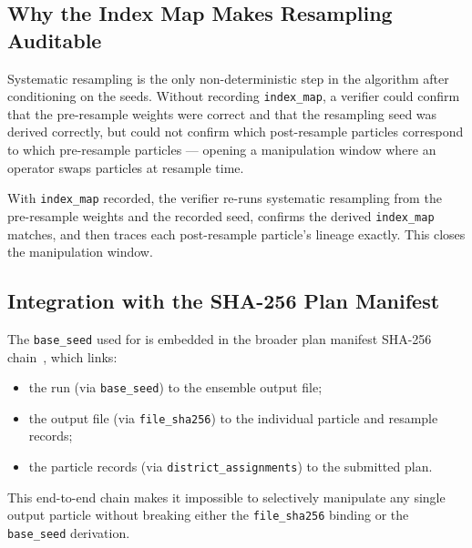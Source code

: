 \subsection{Why the Index Map Makes Resampling Auditable}

Systematic resampling is the only non-deterministic step in the \smc{}
algorithm after conditioning on the seeds.
Without recording \texttt{index\_map}, a verifier could confirm that the
pre-resample weights were correct and that the resampling seed was derived
correctly, but could not confirm which post-resample particles correspond to
which pre-resample particles --- opening a manipulation window where an operator
swaps particles at resample time.

With \texttt{index\_map} recorded, the verifier re-runs systematic resampling
from the pre-resample weights and the recorded seed, confirms the derived
\texttt{index\_map} matches, and then traces each post-resample particle's
lineage exactly.
This closes the manipulation window.

\subsection{Integration with the SHA-256 Plan Manifest}

The \texttt{base\_seed} used for \smc{} is embedded in the broader plan
manifest SHA-256 chain~\citep{b11paper}, which links:
\begin{itemize}
  \item the \smc{} run (via \texttt{base\_seed}) to the ensemble output file;
  \item the output file (via \texttt{file\_sha256}) to the individual particle
        and resample records;
  \item the particle records (via \texttt{district\_assignments}) to the
        submitted plan.
\end{itemize}
This end-to-end chain makes it impossible to selectively manipulate any single
output particle without breaking either the \texttt{file\_sha256} binding or
the \texttt{base\_seed} derivation.
